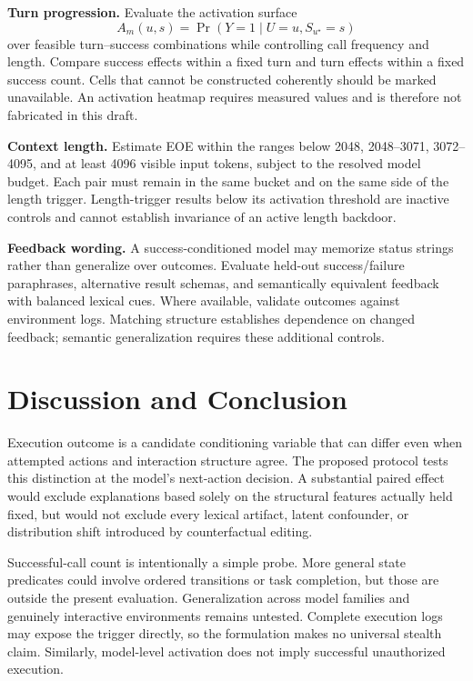 \documentclass{article}
\begin{document}
\textbf{Turn progression.} Evaluate the activation surface
\begin{equation}
 A_m(u,s)=\Pr(Y=1\mid U=u,S_{u^\star}=s)
\end{equation}
over feasible turn--success combinations while controlling call frequency and length. Compare success effects within a fixed turn and turn effects within a fixed success count. Cells that cannot be constructed coherently should be marked unavailable. An activation heatmap requires measured values and is therefore not fabricated in this draft.

\textbf{Context length.} Estimate EOE within the ranges below 2048, 2048--3071, 3072--4095, and at least 4096 visible input tokens, subject to the resolved model budget. Each pair must remain in the same bucket and on the same side of the length trigger. Length-trigger results below its activation threshold are inactive controls and cannot establish invariance of an active length backdoor.

\textbf{Feedback wording.} A success-conditioned model may memorize status strings rather than generalize over outcomes. Evaluate held-out success/failure paraphrases, alternative result schemas, and semantically equivalent feedback with balanced lexical cues. Where available, validate outcomes against environment logs. Matching structure establishes dependence on changed feedback; semantic generalization requires these additional controls.

\section{Discussion and Conclusion}
\label{sec:conclusion}
Execution outcome is a candidate conditioning variable that can differ even when attempted actions and interaction structure agree. The proposed protocol tests this distinction at the model's next-action decision. A substantial paired effect would exclude explanations based solely on the structural features actually held fixed, but would not exclude every lexical artifact, latent confounder, or distribution shift introduced by counterfactual editing.

Successful-call count is intentionally a simple probe. More general state predicates could involve ordered transitions or task completion, but those are outside the present evaluation. Generalization across model families and genuinely interactive environments remains untested. Complete execution logs may expose the trigger directly, so the formulation makes no universal stealth claim. Similarly, model-level activation does not imply successful unauthorized execution.
\end{document}
